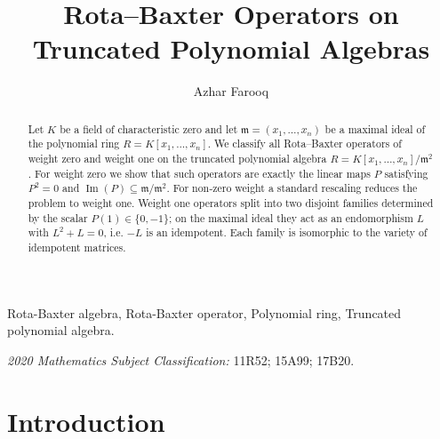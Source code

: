 \documentclass[a4paper,11pt]{elsarticle}
\theoremstyle{definition}
\theoremstyle{remark}
\DeclareMathOperator{\im}{Im}
\newcommand{\m}{\mathfrak{m}}
\begin{document}
\begin{frontmatter}
\title{Rota--Baxter Operators on Truncated Polynomial Algebras}

\author{Azhar Farooq }
\address{Abdus Salam School of Mathematical Sciences,\\ GC University, Lahore-Pakistan\\e-mail:
			azhar.farooq@sms.edu.pk
		}


\begin{abstract}
Let $K$ be a field of characteristic zero and let  $\m = (x_1,\dots,x_n)$ be a maximal ideal of the polynomial ring $R = K[x_1,\dots,x_n]$. We classify all Rota--Baxter operators of weight zero and weight one on the truncated polynomial algebra $R = K[x_1,\dots,x_n]/\m^2$.
For weight zero we show that such operators are exactly the linear maps $P$ satisfying $P^2 = 0$ and $\im(P) \subseteq \m/\m^2$.
For non‑zero weight a standard rescaling reduces the problem to weight one.
Weight one operators split into two disjoint families determined by the scalar $P(1) \in \{0, -1\}$; on the maximal ideal they act as an endomorphism $L$ with $L^2 + L = 0$, i.e. $-L$ is an idempotent.
Each family is isomorphic to the variety of idempotent matrices.
\end{abstract}

\begin{keyword}
Rota-Baxter algebra, Rota-Baxter operator, Polynomial ring, Truncated polynomial algebra.

       {\it{ 2020 Mathematics Subject Classification:}} 11R52; 15A99; 17B20.
\end{keyword}
\end{frontmatter}

\section{Introduction}
\end{document}
